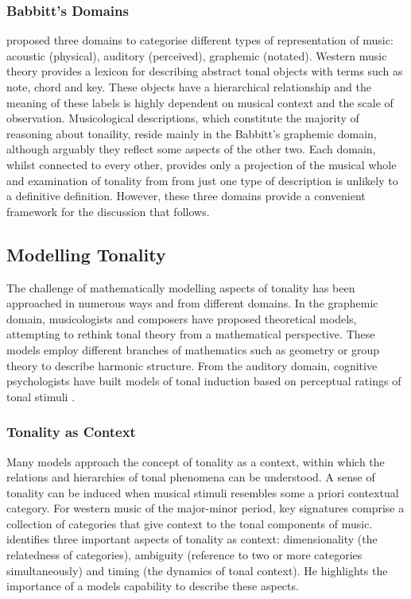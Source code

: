 \documentclass{article}
\begin{document}
\subsubsection{Babbitt's Domains}
\label{sec-2-1-2}

\citet{Babbitt1965} proposed three domains to categorise different
types of representation of music: acoustic (physical), auditory
(perceived), graphemic (notated). Western music theory provides a
lexicon for describing abstract tonal objects with terms such as note,
chord and key. These objects have a hierarchical relationship and the
meaning of these labels is highly dependent on musical context and the
scale of observation. Musicological descriptions, which constitute the
majority of reasoning about tonaility, reside mainly in the Babbitt's
graphemic domain, although arguably they reflect some aspects of the
other two. Each domain, whilst connected to every other, provides only
a projection of the musical whole and examination of tonality from
from just one type of description is unlikely to a definitive
definition. However, these three domains provide a convenient
framework for the discussion that follows.
\subsection{Modelling Tonality}
\label{sec-2-2}

The challenge of mathematically modelling aspects of tonality has been
approached in numerous ways and from different domains. In the
graphemic domain, musicologists and composers have proposed
theoretical models, attempting to rethink tonal theory from a
mathematical perspective. These models employ different branches of
mathematics such as geometry \citep{Tymoczko2012} or group theory
\citep{Ring2011} to describe harmonic structure. From the auditory
domain, cognitive psychologists have built models of tonal induction
based on perceptual ratings of tonal stimuli \citep{Krumhansl1990}.
\subsubsection{Tonality as Context}
\label{sec-2-2-1}

Many models approach the concept of tonality as a context, within
which the relations and hierarchies of tonal phenomena can be
understood. A sense of tonality can be induced when musical stimuli
resembles some a priori contextual category. For western music of the
major-minor period, key signatures comprise a collection of categories
that give context to the tonal components of
music. \citet{Martorell2013} identifies three important aspects of
tonality as context: dimensionality (the relatedness of categories),
ambiguity (reference to two or more categories simultaneously) and
timing (the dynamics of tonal context). He highlights the importance
of a models capability to describe these aspects.
\end{document}
